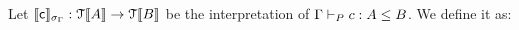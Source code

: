 \documentclass[a4paper,UKenglish,cleveref, autoref, thm-restate]{lipics-v2021}
\begin{document}
\begin{definition}[Interpretation]
Let $\llbracket \textsf{c} \rrbracket_{\sigma_{\Gamma}} : \mathcal{T}\llbracket A \rrbracket \rightarrow \mathcal{T}\llbracket B \rrbracket$ be the interpretation of $\containsG{c}{A}{B}$. We define it as:   
  \begin{displaymath}
    \begin{array}{l}

\end{array}
\end{displaymath}
\end{definition}
\end{document}
